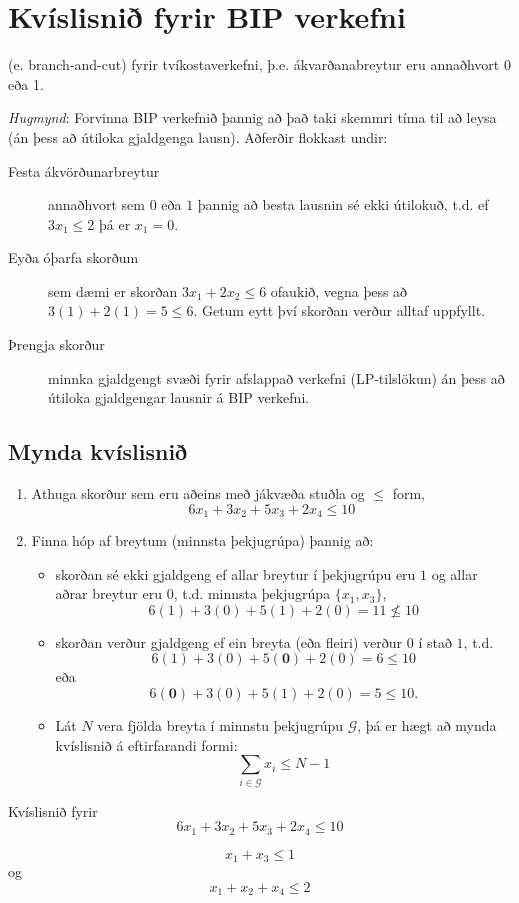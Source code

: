 \section{Kvíslisnið fyrir BIP verkefni}
 (e. branch-and-cut) fyrir tvíkostaverkefni, þ.e. ákvarðanabreytur eru annaðhvort 0 eða 1.

\emph{Hugmynd}: Forvinna BIP verkefnið þannig að það taki skemmri tíma til að leysa (án þess að útiloka gjaldgenga lausn). Aðferðir flokkast undir:

\begin{description}
\item[Festa ákvörðunarbreytur] annaðhvort sem $0$ eða $1$ þannig að besta lausnin sé ekki útilokuð, t.d. ef $3 x_1 \le 2$ þá er $x_1=0$.
\item[Eyða óþarfa skorðum] sem dæmi er skorðan $3x_1+2x_2 \le 6$ ofaukið, vegna þess að $3(1)+2(1) = 5  \le 6$. Getum eytt því skorðan verður alltaf uppfyllt.
\item[Þrengja skorður] minnka gjaldgengt svæði fyrir afslappað verkefni (LP-tilslökun) án þess að útiloka gjaldgengar lausnir á BIP verkefni. 
\end{description}

\subsection{Mynda kvíslisnið}
\begin{enumerate}
\item Athuga skorður sem eru aðeins með jákvæða stuðla og $\le$
  form, $$6x_1 + 3x_2+5x_3+2x_4 \le 10$$
\item Finna hóp af breytum (minnsta þekjugrúpa) þannig að:
\begin{itemize}
\item skorðan sé ekki gjaldgeng ef allar breytur í þekjugrúpu eru
  $1$ og allar aðrar breytur eru $0$, t.d. minnsta þekjugrúpa
  $\{x_1,x_3\}$, $$6(1)+3(0)+5(1)+2(0) = 11 \not\le 10$$
\item skorðan verður gjaldgeng ef ein breyta (eða fleiri) verður $0$
  í stað $1$, t.d.   $$6(1)+3(0)+5(\mathbf{0})+2(0) = 6 \le
  10$$ eða  $$6(\mathbf{0})+3(0)+5(1)+2(0) = 5 \le 10.$$
\item Lát $N$ vera fjölda breyta í minnstu þekjugrúpu $\mathcal{G}$, þá er
  hægt að mynda kvíslisnið á eftirfarandi formi:
$$\sum_{i\in\mathcal{G}}x_i \le N - 1$$
\end{itemize}
\end{enumerate}
\begin{daemi}Kvíslisnið fyrir $$6x_1 + 3x_2+5x_3+2x_4 \le 10$$\end{daemi}
\begin{lausn}
$$x_1 + x_3 \le 1$$
og
$$x_1+x_2+x_4\le 2$$
\end{lausn}
